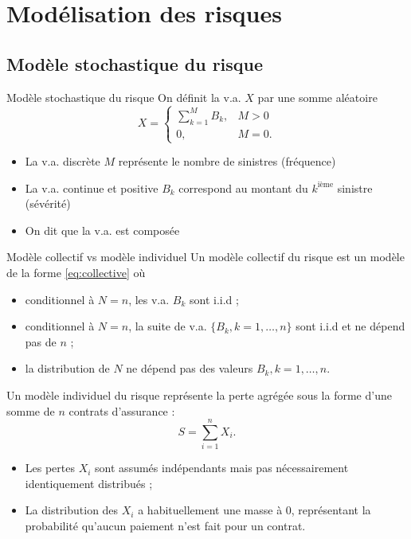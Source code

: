 \chapter{Modélisation des risques}

\section{Modèle stochastique du risque}

\begin{definition}{Modèle stochastique du risque}{}
	On définit la v.a. $X$ par une somme aléatoire 
	\begin{equation}\label{eq:collective}
		X = \begin{cases}
		\sum_{k = 1}^{M}B_k, & M>0\\
		0, & M = 0.
		\end{cases}
	\end{equation}
	
	\begin{itemize}
		\item La v.a. discrète $M$ représente le nombre de sinistres (fréquence)
		\item La v.a. continue et positive $B_k$ correspond au montant du $k^{\text{ième}}$ sinistre (sévérité)
		\item On dit que la v.a. est composée
	\end{itemize}
\end{definition}

\begin{definition}{Modèle collectif vs modèle individuel}{}
	Un modèle collectif du risque est un modèle de la forme \ref{eq:collective} où 
	\begin{itemize}
		\item conditionnel à $N = n$, les v.a. $B_k$ sont i.i.d ;
		\item conditionnel à $N = n$, la suite de v.a. $\{B_k, k = 1, \dots, n\}$ sont i.i.d et ne dépend pas de $n$ ;
		\item la distribution de $N$ ne dépend pas des valeurs $B_k, k = 1, \dots, n$.
	\end{itemize}
	\tcblower
	Un modèle individuel du risque représente la perte agrégée sous la forme d'une somme de $n$ contrats d'assurance : $$S = \sum_{i = 1}^{n}X_i.$$
	\begin{itemize}
		\item Les pertes $X_i$ sont assumés indépendants mais pas nécessairement identiquement distribués ;
		\item La distribution des $X_i$ a habituellement une masse à 0, représentant la probabilité qu'aucun paiement n'est fait pour un contrat. 
	\end{itemize}
\end{definition}


